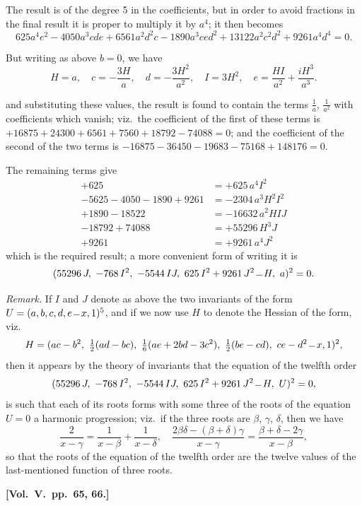\documentclass[11pt,a4paper]{article}
\theoremstyle{plain}
\theoremstyle{definition}
\theoremstyle{remark}
\begin{document}
The result is of the degree 5 in the coefficients, but in order to avoid fractions in the final result it is proper to multiply it by $a^{4}$; it then becomes
\[
625a^{4}e^{2}-4050a^{3}cde+6561a^{2}d^{2}c-1890a^{3}ced^{2}+13122a^{2}c^{2}d^{2}+9261a^{4}d^{4}=0.
\]

But writing as above $b=0$, we have
\[
H=a,\quad c=-\frac{3H}{a},\quad d=-\frac{3H^{2}}{a^{2}},\quad I=3H^{2},\quad e=\frac{HI}{a^{2}}+\frac{iH^{3}}{a^{3}}.
\]

and substituting these values, the result is found to contain the terms $\frac{1}{a}$, $\frac{1}{a^{2}}$ with coefficients which vanish; viz.\ the coefficient of the first of these terms is $+16875+24300+6561+7560+18792-74088=0$; and the coefficient of the second of the two terms is $-16875-36450-19683-75168+148176=0$.

The remaining terms give
\begin{align*}
+625 &= +625\,a^{4}I^{2}\\
-5625-4050-1890+9261 &= -2304\,a^{3}H^{2}I^{2}\\
+1890-18522 &= -16632\,a^{2}HIJ\\
-18792+74088 &= +55296\,H^{3}J\\
+9261 &= +9261\,a^{4}J^{2}
\end{align*}
which is the required result; a more convenient form of writing it is
\[
(55296\,J,\ -768\,I^{2},\ -5544\,IJ,\ 625\,I^{2}+9261\,J^{2}\,\overline{\vrule width 6pt}\,H,\ a)^{2}=0.
\]

\textit{Remark.} If $I$ and $J$ denote as above the two invariants of the form $U=(a,b,c,d,e\,\overline{\vrule width 6pt}\,x,1)^{5}$, and if we now use $H$ to denote the Hessian of the form, viz.
\[
H=(ac-b^{2},\ \tfrac12(ad-bc),\ \tfrac16(ae+2bd-3c^{2}),\ \tfrac12(be-cd),\ ce-d^{2}\,\overline{\vrule width 6pt}\,x,1)^{2},
\]
then it appears by the theory of invariants that the equation of the twelfth order
\[
(55296\,J,\ -768\,I^{2},\ -5544\,IJ,\ 625\,I^{2}+9261\,J^{2}\,\overline{\vrule width 6pt}\,H,\ U)^{2}=0,
\]
is such that each of its roots forms with some three of the roots of the equation $U=0$ a harmonic progression; viz.\ if the three roots are $\beta$, $\gamma$, $\delta$, then we have
\[
\frac{2}{x-\gamma}=\frac{1}{x-\beta}+\frac{1}{x-\delta},\quad \frac{2\beta\delta-(\beta+\delta)\gamma}{x-\gamma}=\frac{\beta+\delta-2\gamma}{x-\beta},
\]
so that the roots of the equation of the twelfth order are the twelve values of the last-mentioned function of three roots.

\textbf{[Vol.\ V.\ pp.\ 65, 66.]}
\end{document}
